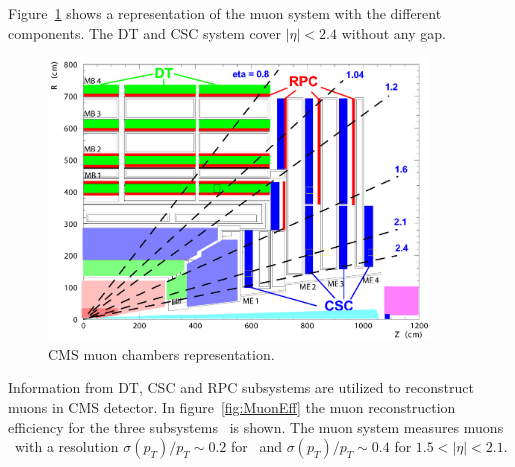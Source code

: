Figure~\ref{fig:cmsmuon} shows a representation of the muon system with the different components. The DT and CSC system cover $|\eta|<2.4$ without any gap. 

\begin{figure}[!Hhtbp]
  \begin{center}
    \includegraphics[width=0.9\textwidth]{figs/MuonDetector.png}
    \caption{CMS muon chambers representation. }
    \label{fig:cmsmuon}
  \end{center}
\end{figure}

Information from DT, CSC and RPC subsystems are utilized to reconstruct muons in CMS detector. In figure~\ref{fig:MuonEff} the muon reconstruction efficiency for the three subsystems~\cite{Chatrchyan:2013sba} is shown. The muon system measures muons \pt~with a resolution $\sigma(p_{T})/p_{T}\sim0.2$ for ~and $\sigma(p_{T})/p_{T}\sim0.4$ for $1.5<|\eta|<2.1$.

